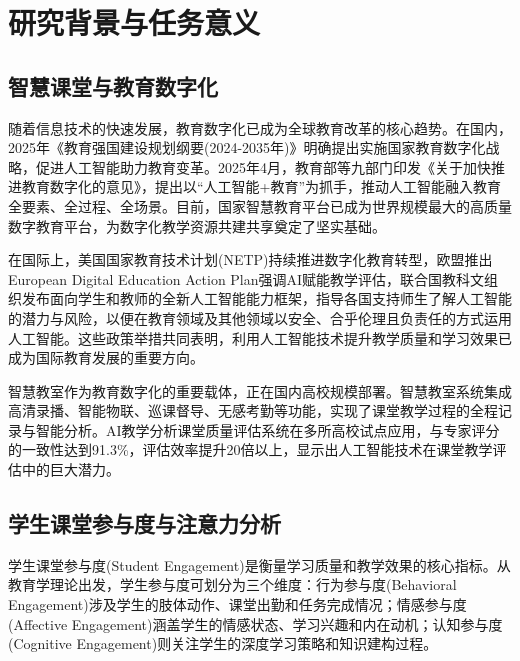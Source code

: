 \documentclass[12pt,hyperref,a4paper,UTF8]{ctexart}
\begin{document}
\cover

%
%

\thispagestyle{empty} %

\newpage
\tableofcontents

\newpage

\section{研究背景与任务意义}

\subsection{智慧课堂与教育数字化}

随着信息技术的快速发展，教育数字化已成为全球教育改革的核心趋势。在国内，2025年《教育强国建设规划纲要(2024-2035年)》明确提出实施国家教育数字化战略，促进人工智能助力教育变革。2025年4月，教育部等九部门印发《关于加快推进教育数字化的意见》，提出以“人工智能+教育”为抓手，推动人工智能融入教育全要素、全过程、全场景。目前，国家智慧教育平台已成为世界规模最大的高质量数字教育平台，为数字化教学资源共建共享奠定了坚实基础。

在国际上，美国国家教育技术计划(NETP)持续推进数字化教育转型，欧盟推出European Digital Education Action Plan强调AI赋能教学评估，联合国教科文组织发布面向学生和教师的全新人工智能能力框架，指导各国支持师生了解人工智能的潜力与风险，以便在教育领域及其他领域以安全、合乎伦理且负责任的方式运用人工智能。这些政策举措共同表明，利用人工智能技术提升教学质量和学习效果已成为国际教育发展的重要方向。

智慧教室作为教育数字化的重要载体，正在国内高校规模部署。智慧教室系统集成高清录播、智能物联、巡课督导、无感考勤等功能，实现了课堂教学过程的全程记录与智能分析。AI教学分析课堂质量评估系统在多所高校试点应用，与专家评分的一致性达到91.3\%，评估效率提升20倍以上，显示出人工智能技术在课堂教学评估中的巨大潜力。

\subsection{学生课堂参与度与注意力分析}

学生课堂参与度(Student Engagement)是衡量学习质量和教学效果的核心指标。从教育学理论出发，学生参与度可划分为三个维度：行为参与度(Behavioral Engagement)涉及学生的肢体动作、课堂出勤和任务完成情况；情感参与度(Affective Engagement)涵盖学生的情感状态、学习兴趣和内在动机；认知参与度(Cognitive Engagement)则关注学生的深度学习策略和知识建构过程。
\end{document}
